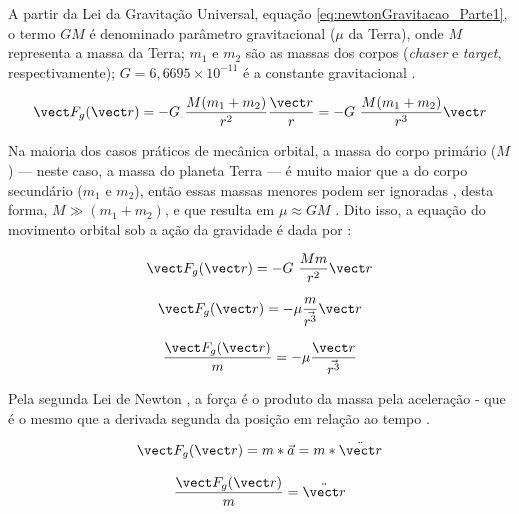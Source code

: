A partir da Lei da Gravitação Universal, equação \eqref{eq:newtonGravitacao_Parte1}, o termo $G M$ é denominado parâmetro gravitacional ($\mu$ da Terra), onde $M$ representa a massa da Terra; $m_1$ e $m_2$ são as massas dos corpos (\textit{chaser} e \textit{target}, respectivamente); $G = 6,6695 \times 10^{-11}$ é a constante gravitacional \cite{halliday2013,wie2008space}.

\begin{equation}
\label{eq:newtonGravitacao_Parte1}
\vect F_g(\vect r) = - G\ \frac{M(m_1+m_2)}{r^2} \frac{\vect r}{r} = - G\ \frac{M(m_1+m_2)}{r^3} {\vect r}
\end{equation}

Na maioria dos casos práticos de mecânica orbital, a massa do corpo primário ($M$) — neste caso, a massa do planeta Terra — é muito maior que a do corpo secundário ($m_1$ e $m_2$), então essas massas menores podem ser ignoradas \cite{Folta2022}, desta forma, $M \gg (m_1 + m_2)$, e que resulta em $\mu \approx GM$ \cite{wie2008space}. Dito isso, a equação do movimento orbital sob a ação da gravidade é dada por \cite{newton1713}:

\begin{equation}
\label{eq:newtonGravitacao_Parte2}
\vect F_g(\vect r) = - G\ \frac{Mm}{r^2} {\vect r}
\end{equation}
 
\begin{equation}
\label{eq:fgParte1}
\vect F_g(\vect r) = -\mu \frac{m}{\vec {r^3}} \vect r
\end{equation}

\begin{equation}
\label{eq:fgParte2}
\frac{\vect F_g(\vect r)}{m} = -\mu \frac{\vect r}{\vec {r^3}}
\end{equation}

Pela segunda Lei de Newton \cite{newton1713}, a força é o produto da massa pela aceleração \cite{halliday2013} - que é o mesmo que a derivada segunda da posição em relação ao tempo \cite{edelstein2018_derivadaSegunda}.

\begin{equation}
\label{eq:F=ma_Halliday2013Parte1}
\vect F_g(\vect r) = m * \vec a = m * \ddot{\vect r}
\end{equation}

\begin{equation}
\label{eq:Fma_Halliday2013_Parte2}
\frac{\vect F_g(\vect r)}{m} = \ddot{\vect r}
\end{equation}

